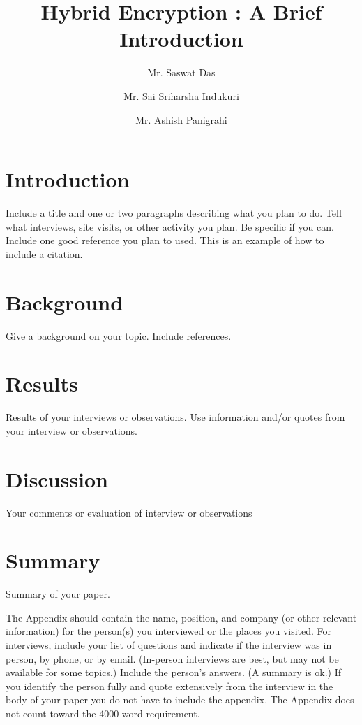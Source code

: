 \documentclass[journal]{IEEEtran}
\begin{document}
\title{Hybrid Encryption : A Brief Introduction}

\author[1]{Mr. Saswat Das}%
\author[2]{Mr. Sai Sriharsha Indukuri}\author[3]{Mr. Ashish Panigrahi}%

\maketitle


\section{Introduction }
Include a title and one or two paragraphs describing what you plan to do. Tell what interviews, site visits, or other activity you plan. Be specific if you can. Include  one good reference you plan to used. This is an example of how to include a citation.

\section{Background}
Give a background on your topic. Include references.

\section{Results}
Results of your interviews or observations. Use information and/or quotes from your interview or observations.

\section{Discussion}
Your comments or evaluation of interview or observations

\section{Summary}
Summary of your paper.

\appendix
The Appendix should contain the name, position, and company (or other relevant information) for the person(s) you interviewed or the places you visited. For interviews, include your list of questions and indicate if the interview was in person, by phone, or by email. (In-person interviews are best, but may not be available for some topics.) Include the person's answers. (A summary is ok.) If you identify the person fully and quote extensively from the interview in the body of your paper you do not have to include the appendix. The Appendix does not count toward the 4000 word requirement.
\end{document}
